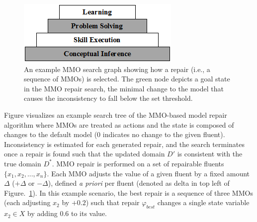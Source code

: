 \documentclass[letterpaper]{article} %
\begin{document}
\begin{figure}
	\centering
	\includegraphics[width=\columnwidth]{cascade.png}
	\caption{An example MMO search graph showing how a repair (i.e., a sequence of MMOs) is selected. The green node depicts a goal state in the MMO repair search, the minimal change to the model that causes the inconsistency to fall below the set threshold.}
	\label{fig:mmo_search}
\end{figure}

Figure visualizes an example search tree of the MMO-based model repair algorithm where MMOs are treated as actions and the state is composed of changes to the default model (0 indicates no change to the given fluent). Inconsistency is estimated for each generated repair, and the search terminates once a repair is found such that the updated domain $D'$ is consistent with the true domain $D^*$. MMO repair is performed on a set of repairable fluents $\{x_1, x_2, ..., x_n\}$. Each MMO adjusts the value of a given fluent by a fixed amount $\Delta$ ($+\Delta$ or $-\Delta$), defined \emph{a priori} per fluent (denoted as delta in top left of Figure.~\ref{fig:mmo_search}). In this example scenario, the best repair is a sequence of three MMOs (each adjusting $x_2$ by $+0.2$) such that repair $\varphi_{best}$ changes a single state variable $x_2 \in X$ by adding $0.6$ to its value.
\end{document}
